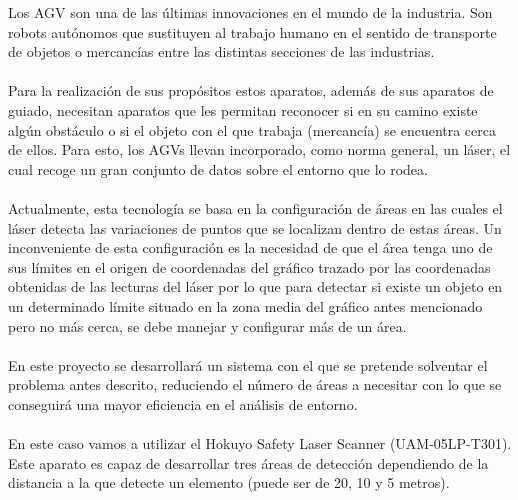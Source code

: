 
Los AGV son una de las últimas innovaciones en el mundo de la industria. Son robots autónomos que sustituyen al trabajo humano en el sentido de transporte de objetos o mercancías entre las distintas secciones de las industrias. \\
\\
Para la realización de sus propósitos estos aparatos, además de sus aparatos de guiado, necesitan aparatos que les permitan reconocer si en su camino existe algún obstáculo o si el objeto con el que trabaja (mercancía) se encuentra cerca de ellos. Para esto, los AGVs llevan incorporado, como norma general, un láser, el cual recoge un gran conjunto de datos sobre el entorno que lo rodea.\\
\\
Actualmente, esta tecnología se basa en la configuración de áreas en las cuales el láser detecta las variaciones de puntos que se localizan dentro de estas áreas. Un inconveniente de esta configuración es la necesidad de que el área tenga uno de sus límites en el origen de coordenadas del gráfico trazado por las coordenadas obtenidas de las lecturas del láser por lo que para detectar si existe un objeto en un determinado límite situado en la zona media del gráfico antes mencionado pero no más cerca, se debe manejar y configurar más de un área.\\
\\
En este proyecto se desarrollará un sistema con el que se pretende solventar el problema antes descrito, reduciendo el número de áreas a necesitar con lo que se conseguirá una mayor eficiencia en el análisis de entorno.\\
\\
En este caso vamos a utilizar el Hokuyo Safety Laser Scanner (UAM-05LP-T301). Este aparato es capaz de desarrollar tres áreas de detección dependiendo de la distancia a la que detecte un elemento (puede ser de 20, 10 y 5 metros).\\